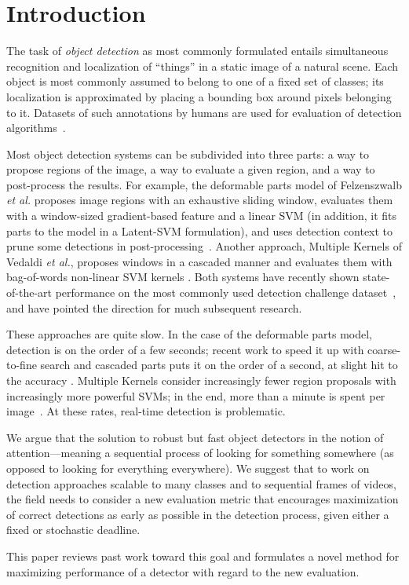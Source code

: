 \section{Introduction} \label{sec:introduction}
The task of \emph{object detection} as most commonly formulated entails simultaneous recognition and localization of ``things'' in a static image of a natural scene.
Each object is most commonly assumed to belong to one of a fixed set of classes; its localization is approximated by placing a bounding box around pixels belonging to it.
Datasets of such annotations by humans are used for evaluation of detection algorithms~\cite{pascal-voc-2010}.

Most object detection systems can be subdivided into three parts: a way to propose regions of the image, a way to evaluate a given region, and a way to post-process the results.
For example, the deformable parts model of Felzenszwalb \emph{et al.} proposes image regions with an exhaustive sliding window, evaluates them with a window-sized gradient-based feature and a linear SVM (in addition, it fits parts to the model in a Latent-SVM formulation), and uses detection context to prune some detections in post-processing~\cite{Felzenszwalb2010a,Felzenszwalb2010b}.
Another approach, Multiple Kernels of Vedaldi \emph{et al.}, proposes windows in a cascaded manner and evaluates them with bag-of-words non-linear SVM kernels \cite{Vedaldi2009}.
Both systems have recently shown state-of-the-art performance on the most commonly used detection challenge dataset~\cite{pascal-voc-2010}, and have pointed the direction for much subsequent research.

These approaches are quite slow.
In the case of the deformable parts model, detection is on the order of a few seconds; recent work to speed it up with coarse-to-fine search and cascaded parts puts it on the order of a second, at slight hit to the accuracy \cite{Pedersoli2011,Felzenszwalb2010b}.
Multiple Kernels consider increasingly fewer region proposals with increasingly more powerful SVMs; in the end, more than a minute is spent per image~\cite{Vijayanarasimhan2011}.
At these rates, real-time detection is problematic.

We argue that the solution to robust but fast object detectors in the notion of attention---meaning a sequential process of looking for something somewhere (as opposed to looking for everything everywhere).
We suggest that to work on detection approaches scalable to many classes and to sequential frames of videos, the field needs to consider a new evaluation metric that encourages maximization of correct detections as early as possible in the detection process, given either a fixed or stochastic deadline.

This paper reviews past work toward this goal and formulates a novel method for maximizing performance of a detector with regard to the new evaluation.